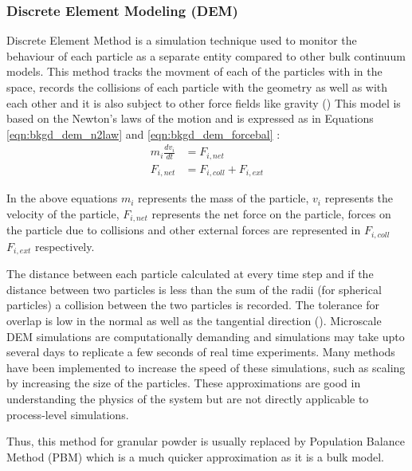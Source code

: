 \documentclass[preprint,11pt,authoryear]{elsarticle}
\begin{document}
	    \subsubsection{Discrete Element Modeling (DEM)}
	    \par Discrete Element Method is a simulation technique used to monitor the behaviour of each particle as a separate entity compared to other bulk continuum models. This method tracks the movment of each of the particles with in the space, records the collisions of each particle with the geometry as well as with each other and it is also subject to other force fields like gravity (\cite{Barrasso2015cerd})  This model is based on the Newton's laws of the motion and is expressed as in Equations \ref{eqn:bkgd_dem_n2law} and  \ref{eqn:bkgd_dem_forcebal} : \\
	\begin{align}
	m_i\frac{dv_i}{dt} &= F_{i,net} \label{eqn:bkgd_dem_n2law} \\
	F_{i,net} &=  F_{i,coll} +  F_{i,ext} \label{eqn:bkgd_dem_forcebal}
	\end{align}
	\par  In the above equations $m_i$ represents the mass of the particle, $v_i$ represents the velocity of the particle, $F_{i,net}$  represents the net force on the particle, forces on the particle due to collisions and other external forces are represented in $F_{i,coll}$ $F_{i,ext}$ respectively.
	\par The distance between each particle calculated at every time step and if the distance between two particles is less than the sum of the radii (for spherical particles)  a collision between the two particles is recorded. The tolerance for overlap is low in the normal as well as the tangential direction (\cite{Cundall1979}). Microscale DEM simulations are computationally demanding and simulations may take upto several days to replicate a few seconds of real time experiments. Many methods have been implemented to increase the speed of these simulations, such as scaling by increasing the size of the particles. These approximations are good in understanding the physics of the system but are not directly applicable to process-level simulations. 
	\par Thus, this method for granular powder is usually replaced by Population Balance Method (PBM) which is a much quicker approximation as it is a bulk model.  
\end{document}
